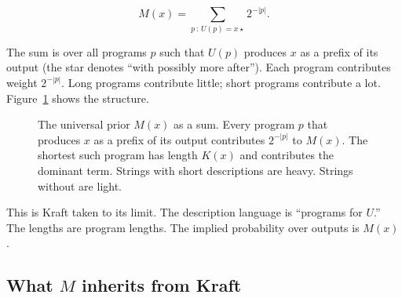 $$M(x) = \sum_{p \,:\, U(p) = x\star} 2^{-|p|}.$$

The sum is over all programs $p$ such that $U(p)$ produces $x$ as a prefix of its output (the star denotes ``with possibly more after''). Each program contributes weight $2^{-|p|}$. Long programs contribute little; short programs contribute a lot. Figure~\ref{fig:M-sum} shows the structure.

\begin{figure}[h]
\centering
{}
\caption{The universal prior $M(x)$ as a sum. Every program $p$ that produces $x$ as a prefix of its output contributes $2^{-|p|}$ to $M(x)$. The shortest such program has length $K(x)$ and contributes the dominant term. Strings with short descriptions are heavy. Strings without are light.}
\label{fig:M-sum}
\end{figure}

This is Kraft taken to its limit. The description language is ``programs for $U$.'' The lengths are program lengths. The implied probability over outputs is $M(x)$.

\subsection*{What $M$ inherits from Kraft}

